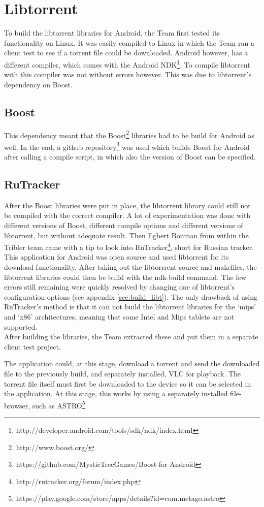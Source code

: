 \section{Libtorrent}
\thispagestyle{fancy}
\label{sec:libtorrent_impl}
To build the libtorrent libraries for Android, the Team first tested its functionality on Linux. It was easily compiled to Linux in which the Team ran a client test to see if a torrent file could be downloaded. Android however, has a different compiler, which comes with the Android NDK\footnote{http://developer.android.com/tools/sdk/ndk/index.html}. To compile libtorrent with this compiler was not without errors however. This was due to libtorrent's dependency on Boost.

\subsection{Boost}
This dependency meant that the Boost\footnote{http://www.boost.org/} libraries had to be build for Android as well. In the end, a github repository\footnote{https://github.com/MysticTreeGames/Boost-for-Android} was used which builds Boost for Android after calling a compile script, in which also the version of Boost can be specified.

\subsection{RuTracker}
After the Boost libraries were put in place, the libtorrent library could still not be compiled with the correct compiler. A lot of experimentation was done with different versions of Boost, different compile options and different versions of libtorrent, but without adequate result. Then Egbert Bouman from within the Tribler team came with a tip to look into RuTracker\footnote{http://rutracker.org/forum/index.php}, short for Russian tracker. This application for Android was open source and used libtorrent for its download functionality. After taking out the libtorrrent source and makefiles, the libtorrent libraries could then be build with the ndk-build command. The few errors still remaining were quickly resolved by changing one of libtorrent's configuration options (see appendix \ref{sec:build_libt}). The only drawback of using RuTracker's method is that it can not build the libtorrent libraries for the `mips' and `x86' architectures, meaning that some Intel and Mips tablets are not supported.\\ 
After building the libraries, the Team extracted these and put them in a separate client test project. 

The application could, at this stage, download a torrent and send the downloaded file to the previously build, and separately installed, VLC for playback. The torrent file itself must first be downloaded to the device so it can be selected in the application. At this stage, this works by using a separately installed file-browser, such as ASTRO\footnote{https://play.google.com/store/apps/details?id=com.metago.astro}.